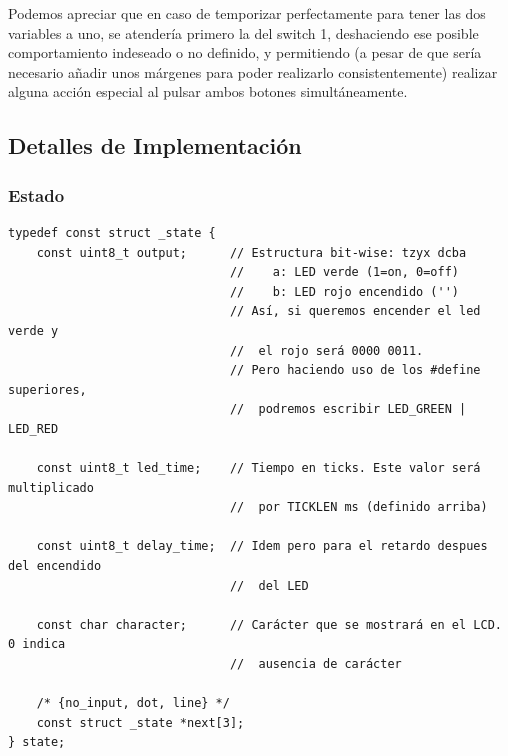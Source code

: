 \documentclass[a4paper,openright,12pt]{article}
\begin{document}
Podemos apreciar que en caso de temporizar perfectamente para tener las dos variables a uno, se atendería primero la del switch 1, deshaciendo ese posible comportamiento
indeseado o no definido, y permitiendo (a pesar de que sería necesario añadir unos márgenes para poder realizarlo consistentemente) realizar alguna acción especial al pulsar ambos
botones simultáneamente.

\subsection{Detalles de Implementación}
\subsubsection{Estado}
\begin{samepage}    
\begin{verbatim}
typedef const struct _state {
    const uint8_t output;      // Estructura bit-wise: tzyx dcba
                               //    a: LED verde (1=on, 0=off)
                               //    b: LED rojo encendido ('')
                               // Así, si queremos encender el led verde y
                               //  el rojo será 0000 0011.
                               // Pero haciendo uso de los #define superiores,
                               //  podremos escribir LED_GREEN | LED_RED 

    const uint8_t led_time;    // Tiempo en ticks. Este valor será multiplicado
                               //  por TICKLEN ms (definido arriba)

    const uint8_t delay_time;  // Idem pero para el retardo despues del encendido
                               //  del LED
    
    const char character;      // Carácter que se mostrará en el LCD. 0 indica
                               //  ausencia de carácter
    
    /* {no_input, dot, line} */
    const struct _state *next[3];
} state;
\end{verbatim}
\end{samepage}
\end{document}
